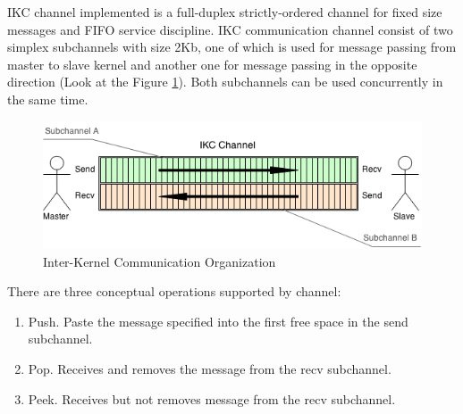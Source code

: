 \documentclass[a4paper,10pt]{article}
\begin{document}
	IKC channel implemented is a full-duplex strictly-ordered channel for fixed size messages and FIFO service discipline. 
	IKC communication channel consist of two simplex subchannels with size 2Kb, one of which is used for message passing from master to slave kernel and another one for message passing in the opposite direction (Look at the Figure \ref{fig:ikc}).
	Both subchannels can be used concurrently in the same time. 
	
	\begin{figure}[ht]
		\centering
   		\includegraphics[width=\textwidth]{IKC_Structure.png}
		\caption{Inter-Kernel Communication Organization}
    		\label{fig:ikc}
	\end{figure} 
		
	There are three conceptual operations supported by channel:
	\begin{enumerate}
		\item Push. Paste the message specified into the first free space in the send subchannel. 
		\item Pop. Receives and removes the message from the recv subchannel.
		\item Peek. Receives but not removes message from the recv subchannel.
	\end{enumerate}
	
\end{document}
